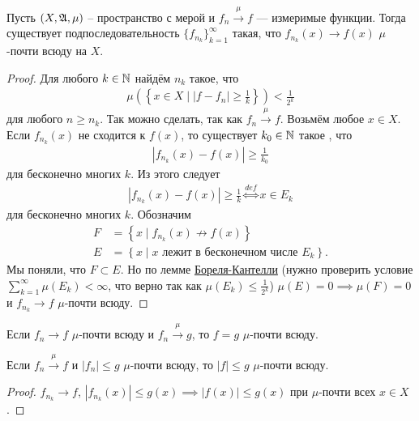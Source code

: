 \begin{thm}
 \label{theorem:measure-convergence-subsequence}
 Пусть $(X, \mathfrak{A}, \mu)$ -- пространство с мерой и $f_n \xrightarrow{\mu} f$ --- измеримые функции. Тогда существует подпоследовательность $\{f_{n_k}\}_{k=1}^{\infty} $ такая, что $f_{n_k}(x) \to f(x)$ $\mu$-почти всюду на $X$.
\end{thm}
\begin{proof}
 Для любого $k \in \mathbb{N}$ найдём $n_k$ такое, что 
\begin{align*}
\mu \left( \left\{ x \in X \mid \left| f - f_{n} \right| \geqslant \frac{1}{k} \right\} \right) < \frac{1}{2^{k}}
\end{align*}
для любого $n \geqslant n_k$. Так можно сделать, так как $f_n \xrightarrow{\mu} f$. Возьмём любое $x \in X$. Если $f_{n_k}(x)$ не сходится к $f(x)$, то существует $k_0 \in \mathbb{N}$ такое , что \begin{align*}
 \left| f_{n_k}(x) - f(x) \right| \geqslant \frac{1}{k_0}
\end{align*} для бесконечно многих $k$. Из этого следует  \begin{align*}
\left| f_{n_k}(x) - f(x) \right| \geqslant \frac{1}{k} \overset{def}{\iff} x \in E_k
\end{align*} для бесконечно многих $k$. Обозначим \begin{align*}
F &= \left\{ x \mid f_{n_k}(x) \not\to f(x) \right\} \\
E &= \left\{ x \mid x \text{ лежит в бесконечном числе $E_k$} \right\}
.\end{align*} Мы поняли, что $F \subset E$. Но по лемме \hyperref[lemma:borel-cantelli]{Бореля-Кантелли} (нужно проверить условие $\sum_{k=1}^{\infty} \mu(E_k) < \infty$, что верно так как $\mu(E_k) \leqslant \frac{1}{2^{k}}$) $\mu(E) = 0 \implies \mu(F) = 0$ и $f_{n_k} \to f$ $\mu$-почти всюду.
\end{proof}
\begin{crly}
 Если $f_n \to f$ $\mu$-почти всюду и $f_n \xrightarrow{\mu} g$, то $f=g$ $\mu$-почти всюду.
\end{crly}
\begin{crly}
 Если $f_n \xrightarrow{\mu} f$ и $\left| f_n \right| \leqslant g$ $\mu$-почти всюду, то $\left| f \right| \leqslant g$ $\mu$-почти всюду.
\end{crly}
\begin{proof}
 $f_{n_k} \to f$, $\left| f_{n_k}(x) \right| \leqslant g(x) \implies \left| f(x) \right| \leqslant g(x)$  при $\mu$-почти всех $x \in X$.
\end{proof}

